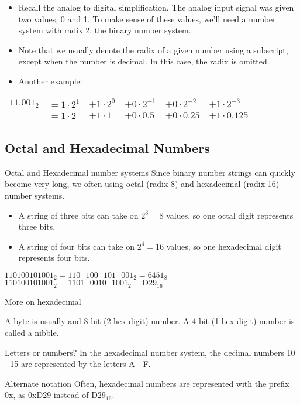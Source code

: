 \begin{itemize}
  \item Recall the analog to digital simplification.  The analog input signal was given two values, 0 and 1.  To make sense of these values, we'll need a number system with radix 2, the binary number system.
  \item Note that we usually denote the radix of a given number using a subscript, except when the number is decimal.  In this case, the radix is omitted.
  \item Another example:
\end{itemize}

\begin{tabular}{llllll}
  $11.001_2$ & $= 1 \cdot 2^1$ & $+ 1 \cdot 2^0$ & $+ 0 \cdot 2^{-1}$ & $+ 0 \cdot 2^{-2}$ & $+ 1 \cdot 2^{-3}$\\
  & $= 1 \cdot 2$ & $+ 1 \cdot 1$ & $+ 0 \cdot 0.5$ & $+ 0 \cdot 0.25$ & $+ 1 \cdot 0.125$
\end{tabular}

\subsection{Octal and Hexadecimal Numbers}

\begin{frame}{Octal and Hexadecimal number systems}
  Since binary number strings can quickly become very long, we often using octal (radix 8) and hexadecimal (radix 16) number systems.
  \begin{itemize}
    \item A string of three bits can take on $2^3 = 8$ values, so one octal digit represents three bits.
    \item A string of four bits can take on $2^4 = 16$ values, so one hexadecimal digit represents four bits.
  \end{itemize}
  \begin{example}
    $110100101001_2 = 110 \text{ } 100 \text{ } 101 \text{ } 001_2= 6451_8$
    $110100101001_2 = 1101 \text{ } 0010 \text{ } 1001_2 = \text{D}29_{16}$
  \end{example}
\end{frame}

\begin{frame}{More on hexadecimal}
  \begin{definition}
    A \alert{byte} is usually and 8-bit (2 hex digit) number.  A 4-bit (1 hex digit) number is called a \alert{nibble}.
  \end{definition}
  \begin{block}{Letters or numbers?}
    In the hexadecimal number system, the decimal numbers 10 - 15 are represented by the letters A - F.
  \end{block}
  \begin{block}{Alternate notation}
    Often, hexadecimal numbers are represented with the prefix 0x, as 0xD29 instead of $\text{D}29_{16}$.
  \end{block}
\end{frame}

